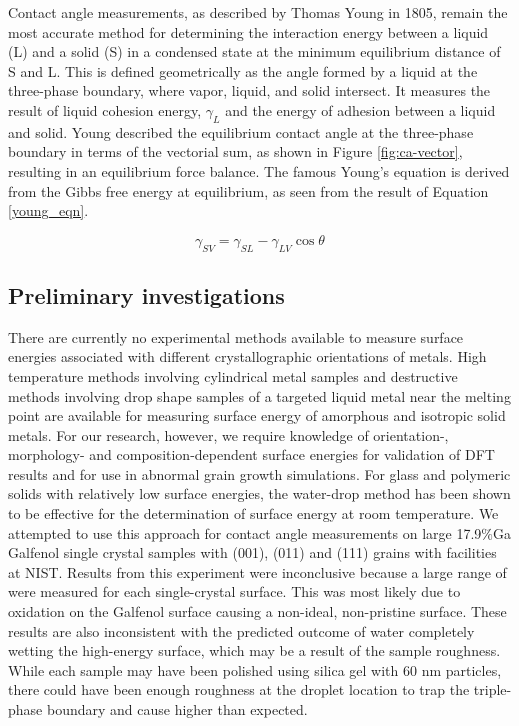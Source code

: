  Contact angle measurements, as described by Thomas Young in 1805, remain the most accurate method for determining the interaction energy between a liquid (L) and a solid (S) in a condensed state at the minimum equilibrium distance of S and L. This is defined geometrically as the angle formed by a liquid at the three-phase boundary, where vapor, liquid, and solid intersect. It measures the result of liquid cohesion energy, $\gamma_{L}$ and the energy of adhesion between a liquid and solid. Young described the equilibrium contact angle at the three-phase boundary in terms of the vectorial sum, as shown in Figure \ref{fig:ca-vector}, resulting in an equilibrium force balance. The famous Young's equation is derived from the Gibbs free energy at equilibrium, as seen from the result of Equation \ref{young_eqn}. 


\hypertarget{youngeqn}{}
\begin{equation}\label{young_eqn}
	\boxed{\gamma_{SV} =\gamma_{SL}-\gamma_{LV}\cos\theta}	
\end{equation}

\subsection{Preliminary investigations}
There are currently no experimental methods available to measure surface energies associated with different crystallographic orientations of metals. High temperature methods involving cylindrical metal samples and destructive methods involving drop shape samples of a targeted liquid metal near the melting point are available for measuring surface energy of amorphous and isotropic solid metals.\cite{Egry2010,Aqra2011,Cao2011} For our research, however, we require knowledge of orientation-, morphology- and composition-dependent surface energies for validation of DFT results and for use in abnormal grain growth simulations. For glass and polymeric solids with relatively low surface energies, the water-drop method has been shown to be effective for the determination of surface energy at room temperature.\cite{Ahadian2010,Kwok2000,Tavana2005} We attempted to use this approach for contact angle measurements on large 17.9$\%$Ga Galfenol single crystal samples with \hkl(001), \hkl(011) and \hkl(111) grains with facilities at NIST. Results from this experiment were inconclusive because a large range of \ca[s] were measured for each single-crystal surface. This was most likely due to oxidation on the Galfenol surface causing a non-ideal, non-pristine surface. These results are also inconsistent with the predicted outcome of water completely wetting the high-energy surface, which may be a result of the sample roughness. While each sample may have been polished using silica gel with 60 nm particles,\cite{Costa2016} there could have been enough roughness at the droplet location to trap the triple-phase boundary and cause higher \ca[s] than expected. 

